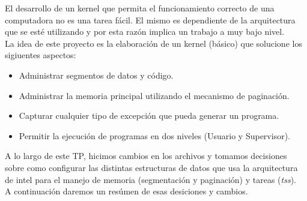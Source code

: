 El desarrollo de un kernel que permita el funcionamiento correcto de una computadora no es una tarea fácil. El mismo es dependiente de la arquitectura que se esté utilizando y por esta razón implica un trabajo a muy bajo nivel.\\

La idea de este proyecto es la elaboración de un kernel (básico) que solucione los sigiuentes aspectos:
\begin{itemize}
	\item Administrar segmentos de datos y código.
	\item Administrar la memoria principal utilizando el mecanismo de paginación.
	\item Capturar cualquier tipo de excepción que pueda generar un programa.
	\item Permitir la ejecución de programas en dos niveles (Usuario y Supervisor).
\end{itemize}

A lo largo de este TP, hicimos cambios en los archivos y tomamos decisiones sobre como configurar las distintas estructuras de datos que usa la arquitectura de intel para el manejo de memoria (segmentación y paginación) y tareas (\textit{tss}).\\

A continuación daremos un resúmen de esas desiciones y cambios.

